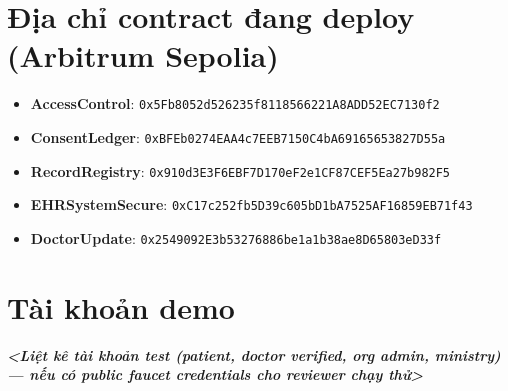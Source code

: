 \documentclass[../DoAn]{subfiles}
\begin{document}
\section{Địa chỉ contract đang deploy (Arbitrum Sepolia)}

\begin{itemize}
    \item \textbf{AccessControl}: \texttt{0x5Fb8052d526235f8118566221A8ADD52EC7130f2}
    \item \textbf{ConsentLedger}: \texttt{0xBFEb0274EAA4c7EEB7150C4bA69165653827D55a}
    \item \textbf{RecordRegistry}: \texttt{0x910d3E3F6EBF7D170eF2e1CF87CEF5Ea27b982F5}
    \item \textbf{EHRSystemSecure}: \texttt{0xC17c252fb5D39c605bD1bA7525AF16859EB71f43}
    \item \textbf{DoctorUpdate}: \texttt{0x2549092E3b53276886be1a1b38ae8D65803eD33f}
\end{itemize}

\section{Tài khoản demo}

\textit{\textbf{<Liệt kê tài khoản test (patient, doctor verified, org admin, ministry) — nếu có public faucet credentials cho reviewer chạy thử>}}
\end{document}
